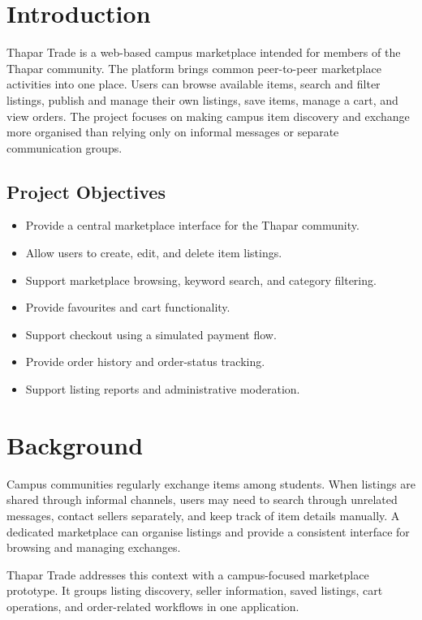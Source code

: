 \documentclass[12pt,a4paper]{report}
\begin{document}
\tableofcontents
\listoffigures
\clearpage
{}

\chapter{Introduction}
Thapar Trade is a web-based campus marketplace intended for members of the
Thapar community. The platform brings common peer-to-peer marketplace activities
into one place. Users can browse available items, search and filter listings,
publish and manage their own listings, save items, manage a cart, and view orders.
The project focuses on making campus item discovery and exchange more organised
than relying only on informal messages or separate communication groups.

\section{Project Objectives}
\begin{itemize}
    \item Provide a central marketplace interface for the Thapar community.
    \item Allow users to create, edit, and delete item listings.
    \item Support marketplace browsing, keyword search, and category filtering.
    \item Provide favourites and cart functionality.
    \item Support checkout using a simulated payment flow.
    \item Provide order history and order-status tracking.
    \item Support listing reports and administrative moderation.
\end{itemize}

\chapter{Background}
Campus communities regularly exchange items among students. When listings are
shared through informal channels, users may need to search through unrelated
messages, contact sellers separately, and keep track of item details manually.
A dedicated marketplace can organise listings and provide a consistent interface
for browsing and managing exchanges.

Thapar Trade addresses this context with a campus-focused marketplace prototype.
It groups listing discovery, seller information, saved listings, cart operations,
and order-related workflows in one application.
\end{document}
